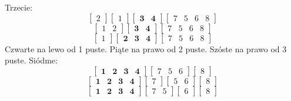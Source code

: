 \documentclass[10pt, oneside]{article}
\theoremstyle{remark}
\begin{document}
Trzecie:
$$\begin{bmatrix} 2 \end{bmatrix} \begin{bmatrix} 1 \end{bmatrix} \begin{bmatrix} \mathbf{3} & \mathbf{4} \end{bmatrix} \begin{bmatrix} 7 & 5 & 6 & 8 \end{bmatrix}$$
$$\begin{bmatrix} 1 & 2 \end{bmatrix} \begin{bmatrix} \mathbf{3} & \mathbf{4} \end{bmatrix} \begin{bmatrix} 7 & 5 & 6 & 8 \end{bmatrix}$$
$$\begin{bmatrix} 1 \end{bmatrix} \begin{bmatrix} \mathbf{2} & \mathbf{3} & \mathbf{4} \end{bmatrix} \begin{bmatrix} 7 & 5 & 6 & 8 \end{bmatrix}$$
Czwarte na lewo od 1 puste.
Piąte na prawo od 2 puste.
Szóste na prawo od 3 puste.
Siódme:
$$\begin{bmatrix} \mathbf{1} & \mathbf{2} & \mathbf{3} & \mathbf{4} \end{bmatrix} \begin{bmatrix} 7 & 5 & 6 \end{bmatrix} \begin{bmatrix} 8 \end{bmatrix}$$
$$\begin{bmatrix} \mathbf{1} & \mathbf{2} & \mathbf{3} & \mathbf{4} \end{bmatrix} \begin{bmatrix} 7 \end{bmatrix} \begin{bmatrix} 5 & 6 \end{bmatrix} \begin{bmatrix} 8 \end{bmatrix}$$
$$\begin{bmatrix} \mathbf{1} & \mathbf{2} & \mathbf{3} & \mathbf{4} \end{bmatrix} \begin{bmatrix} 7 & 5 \end{bmatrix} \begin{bmatrix} 6 \end{bmatrix} \begin{bmatrix} 8 \end{bmatrix}$$
\end{document}
